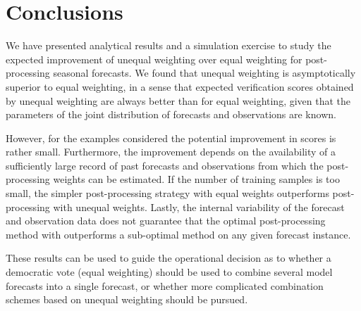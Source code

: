 \documentclass[12pt]{article}
\begin{document}
\section{Conclusions}

We have presented analytical results and a simulation exercise to study the expected improvement of unequal weighting over equal weighting for post-processing seasonal forecasts.
We found that unequal weighting is asymptotically superior to equal weighting, in a sense that expected verification scores obtained by unequal weighting are always better than for equal weighting, given that the parameters of the joint distribution of forecasts and observations are known.

However, for the examples considered the potential improvement in scores is rather small.
Furthermore, the improvement depends on the availability of a sufficiently large record of past forecasts and observations from which the post-processing weights can be estimated. 
If the number of training samples is too small, the simpler post-processing strategy with equal weights outperforms post-processing with unequal weights.
Lastly, the internal variability of the forecast and observation data does not guarantee that the optimal post-processing method with outperforms a sub-optimal method on any given forecast instance.

These results can be used to guide the operational decision as to whether a democratic vote (equal weighting) should be used to combine several model forecasts into a single forecast, or whether more complicated combination schemes based on unequal weighting should be pursued.
\end{document}
